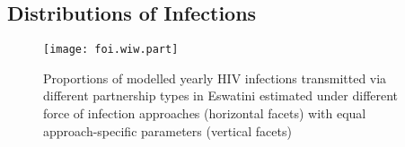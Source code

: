 \subsection{Distributions of Infections}\label{sr.foi.exp}

\begin{figure}
  \texttt{[image: foi.wiw.part]}
  \caption{Proportions of modelled yearly HIV infections
    transmitted via different partnership types in Eswatini
    estimated under different force of infection approaches (horizontal facets)
    with equal \vs approach-specific parameters (vertical facets)}
  \label{fig:foi.wiw.part}
\end{figure}
